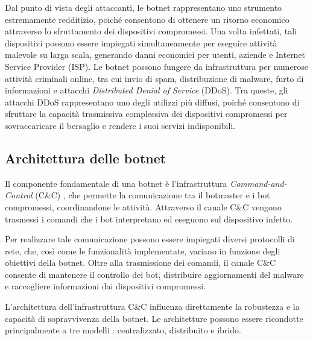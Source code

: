 Dal punto di vista degli attaccanti, le botnet rappresentano uno strumento estremamente redditizio, poiché consentono di ottenere un ritorno economico attraverso lo sfruttamento dei dispositivi compromessi. Una volta infettati, tali dispositivi possono essere impiegati simultaneamente per eseguire attività malevole su larga scala, generando danni economici per utenti, aziende e Internet Service Provider (ISP). Le botnet possono fungere da infrastruttura per numerose attività criminali online, tra cui invio di spam, distribuzione di malware, furto di informazioni e attacchi \emph{Distributed Denial of Service} (DDoS). Tra queste, gli attacchi DDoS rappresentano uno degli utilizzi più diffusi, poiché consentono di sfruttare la capacità trasmissiva complessiva dei dispositivi compromessi per sovraccaricare il bersaglio e rendere i suoi servizi indisponibili. %

\subsection{Architettura delle botnet} %

Il componente fondamentale di una botnet è l'infrastruttura \emph{Command-and-Control} (C\&C) \cite{silva2013botnets}, che permette la comunicazione tra il botmaster e i bot compromessi, coordinandone le attività. Attraverso il canale C\&C vengono trasmessi i comandi che i bot interpretano ed eseguono sul dispositivo infetto. %

Per realizzare tale comunicazione possono essere impiegati diversi protocolli di rete, che, così come le funzionalità implementate, variano in funzione degli obiettivi della botnet. Oltre alla trasmissione dei comandi, il canale C\&C consente di mantenere il controllo dei bot, distribuire aggiornamenti del malware e raccogliere informazioni dai dispositivi compromessi. 


L'architettura dell'infrastruttura C\&C influenza direttamente la robustezza e la capacità di sopravvivenza della botnet. Le architetture possono essere ricondotte principalmente a tre modelli \cite{silva2013botnets, hachem2011topology}: centralizzato, distribuito e ibrido. %


